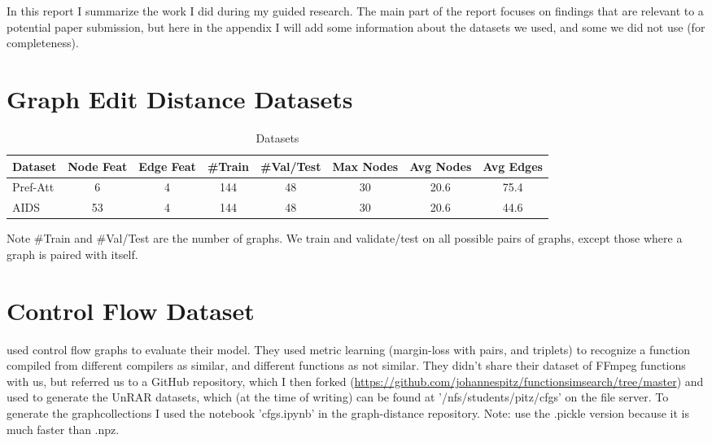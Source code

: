 \appendix
\appendixpage

In this report I summarize the work I did during my guided research. The main part of the report focuses on findings that are relevant to a potential paper submission, but here in the appendix I will add some information about the datasets we used, and some we did not use (for completeness).


\section{Graph Edit Distance Datasets}
\label{appendix:GED}
\begin{table}[htbp]
    \addtolength{\tabcolsep}{-1pt}
    \fontsize{9pt}{10.25pt}\selectfont
    \centering
    \renewcommand{\arraystretch}{1.2}
    \begin{tabular}{|l|c|c|c|c|c|c|c|}
        \hline
        Dataset & Node Feat & Edge Feat & \#Train & \#Val/Test & Max Nodes & Avg Nodes & Avg Edges \\
        \hline
        Pref-Att & 6 & 4 & 144 & 48 & 30 & 20.6 & 75.4 \\ %
        \hline
        AIDS & 53 & 4 & 144 & 48 & 30 & 20.6 & 44.6 \\ %
        \hline
    \end{tabular}
    \caption{Datasets}
    \label{tab:ex1-data}
\end{table}

Note \#Train and \#Val/Test are the number of graphs. We train and validate/test on all possible pairs of graphs, except those where a graph is paired with itself.

\section{Control Flow Dataset}
\label{appendix:CFG}

\cite{li2019} used control flow graphs to evaluate their model. They used metric learning (margin-loss with pairs, and triplets) to recognize a function compiled from different compilers as similar, and different functions as not similar. They didn't share their dataset of FFmpeg functions with us, but referred us to a GitHub repository, which I then forked (\url{https://github.com/johannespitz/functionsimsearch/tree/master}) and used to generate the UnRAR datasets, which (at the time of writing) can be found at '/nfs/students/pitz/cfgs' on the file server. To generate the graphcollections I used the notebook 'cfgs.ipynb' in the graph-distance repository. Note: use the .pickle version because it is much faster than .npz.

